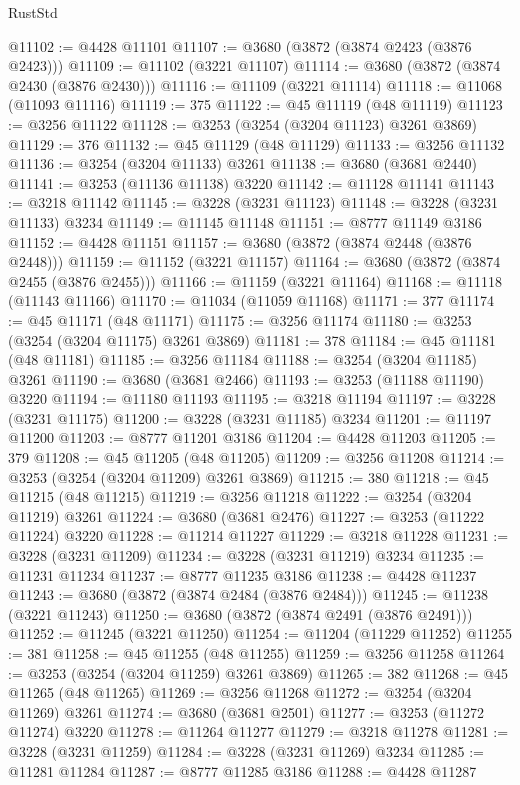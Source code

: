 \begin{lexlean}{RustStd}
\begin{coremodule}
@11102 := @4428 @11101
@11107 := @3680 (@3872 (@3874 @2423 (@3876 @2423)))
@11109 := @11102 (@3221 @11107)
@11114 := @3680 (@3872 (@3874 @2430 (@3876 @2430)))
@11116 := @11109 (@3221 @11114)
@11118 := @11068 (@11093 @11116)
@11119 := 375
@11122 := @45 @11119 (@48 @11119)
@11123 := @3256 @11122
@11128 := @3253 (@3254 (@3204 @11123) @3261 @3869)
@11129 := 376
@11132 := @45 @11129 (@48 @11129)
@11133 := @3256 @11132
@11136 := @3254 (@3204 @11133) @3261
@11138 := @3680 (@3681 @2440)
@11141 := @3253 (@11136 @11138) @3220
@11142 := @11128 @11141
@11143 := @3218 @11142
@11145 := @3228 (@3231 @11123)
@11148 := @3228 (@3231 @11133) @3234
@11149 := @11145 @11148
@11151 := @8777 @11149 @3186
@11152 := @4428 @11151
@11157 := @3680 (@3872 (@3874 @2448 (@3876 @2448)))
@11159 := @11152 (@3221 @11157)
@11164 := @3680 (@3872 (@3874 @2455 (@3876 @2455)))
@11166 := @11159 (@3221 @11164)
@11168 := @11118 (@11143 @11166)
@11170 := @11034 (@11059 @11168)
@11171 := 377
@11174 := @45 @11171 (@48 @11171)
@11175 := @3256 @11174
@11180 := @3253 (@3254 (@3204 @11175) @3261 @3869)
@11181 := 378
@11184 := @45 @11181 (@48 @11181)
@11185 := @3256 @11184
@11188 := @3254 (@3204 @11185) @3261
@11190 := @3680 (@3681 @2466)
@11193 := @3253 (@11188 @11190) @3220
@11194 := @11180 @11193
@11195 := @3218 @11194
@11197 := @3228 (@3231 @11175)
@11200 := @3228 (@3231 @11185) @3234
@11201 := @11197 @11200
@11203 := @8777 @11201 @3186
@11204 := @4428 @11203
@11205 := 379
@11208 := @45 @11205 (@48 @11205)
@11209 := @3256 @11208
@11214 := @3253 (@3254 (@3204 @11209) @3261 @3869)
@11215 := 380
@11218 := @45 @11215 (@48 @11215)
@11219 := @3256 @11218
@11222 := @3254 (@3204 @11219) @3261
@11224 := @3680 (@3681 @2476)
@11227 := @3253 (@11222 @11224) @3220
@11228 := @11214 @11227
@11229 := @3218 @11228
@11231 := @3228 (@3231 @11209)
@11234 := @3228 (@3231 @11219) @3234
@11235 := @11231 @11234
@11237 := @8777 @11235 @3186
@11238 := @4428 @11237
@11243 := @3680 (@3872 (@3874 @2484 (@3876 @2484)))
@11245 := @11238 (@3221 @11243)
@11250 := @3680 (@3872 (@3874 @2491 (@3876 @2491)))
@11252 := @11245 (@3221 @11250)
@11254 := @11204 (@11229 @11252)
@11255 := 381
@11258 := @45 @11255 (@48 @11255)
@11259 := @3256 @11258
@11264 := @3253 (@3254 (@3204 @11259) @3261 @3869)
@11265 := 382
@11268 := @45 @11265 (@48 @11265)
@11269 := @3256 @11268
@11272 := @3254 (@3204 @11269) @3261
@11274 := @3680 (@3681 @2501)
@11277 := @3253 (@11272 @11274) @3220
@11278 := @11264 @11277
@11279 := @3218 @11278
@11281 := @3228 (@3231 @11259)
@11284 := @3228 (@3231 @11269) @3234
@11285 := @11281 @11284
@11287 := @8777 @11285 @3186
@11288 := @4428 @11287

\end{coremodule}
\end{lexlean}
